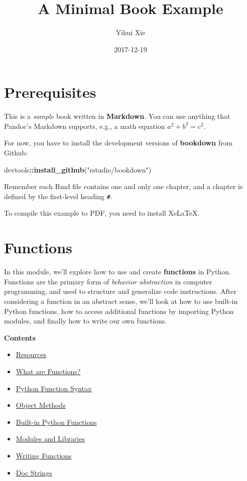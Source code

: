 \documentclass[]{book}
\title{A Minimal Book Example}
\author{Yihui Xie}
\date{2017-12-19}
\newenvironment{Shaded}{\begin{snugshade}}{\end{snugshade}}
\newcommand{\KeywordTok}[1]{\textcolor[rgb]{0.13,0.29,0.53}{\textbf{#1}}}
\newcommand{\StringTok}[1]{\textcolor[rgb]{0.31,0.60,0.02}{#1}}
\newcommand{\OperatorTok}[1]{\textcolor[rgb]{0.81,0.36,0.00}{\textbf{#1}}}
\newcommand{\NormalTok}[1]{#1}
\providecommand{\tightlist}{%
  \setlength{\itemsep}{0pt}\setlength{\parskip}{0pt}}
\begin{document}
\maketitle

{
\setcounter{tocdepth}{1}
\tableofcontents
}
\chapter{Prerequisites}\label{prerequisites}

This is a \emph{sample} book written in \textbf{Markdown}. You can use
anything that Pandoc's Markdown supports, e.g., a math equation
\(a^2 + b^2 = c^2\).

For now, you have to install the development versions of
\textbf{bookdown} from Github:

\begin{Shaded}
\begin{Highlighting}[]
\NormalTok{devtools}\OperatorTok{::}\KeywordTok{install_github}\NormalTok{(}\StringTok{"rstudio/bookdown"}\NormalTok{)}
\end{Highlighting}
\end{Shaded}

Remember each Rmd file contains one and only one chapter, and a chapter
is defined by the first-level heading \texttt{\#}.

To compile this example to PDF, you need to install XeLaTeX.

\chapter{Functions}\label{functions}

In this module, we'll explore how to use and create \textbf{functions}
in Python. Functions are the primary form of \emph{behavior abstraction}
in computer programming, and used to structure and generalize code
instructions. After considering a function in an abstract sense, we'll
look at how to use built-in Python functions, how to access additional
functions by importing Python modules, and finally how to write our own
functions.

\textbf{Contents}

\begin{itemize}
\tightlist
\item
  \protect\hyperlink{resources}{Resources}
\item
  \protect\hyperlink{what-are-functions}{What are Functions?}
\item
  \protect\hyperlink{python-function-syntax}{Python Function Syntax}
\item
  \protect\hyperlink{object-methods}{Object Methods}
\item
  \protect\hyperlink{built-in-python-functions}{Built-in Python
  Functions}
\item
  \protect\hyperlink{modules-and-libraries}{Modules and Libraries}
\item
  \protect\hyperlink{writing-functions}{Writing Functions}
\item
  \protect\hyperlink{doc-strings}{Doc Strings}
\end{itemize}
\end{document}
